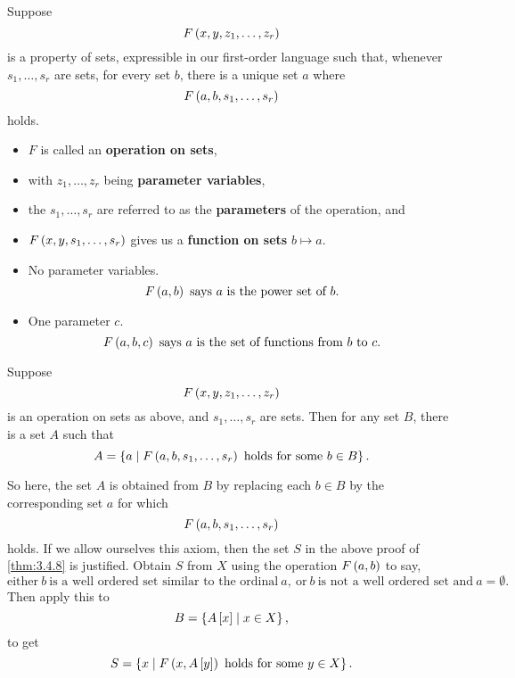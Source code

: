 \pagebreak

\begin{definition}
\label{def:3.4.9}
Suppose
$$ F\left( x, y, z_1, \dots, z_r \right) $$
is a property of sets, expressible in our first-order language such that, whenever $ s_1, \dots, s_r $ are sets, for every set $ b $, there is a unique set $ a $ where
$$ F\left( a, b, s_1, \dots, s_r \right) $$
holds.
\begin{itemize}
\item $ F $ is called an \textbf{operation on sets},
\item with $ z_1, \dots, z_r $ being \textbf{parameter variables},
\item the $ s_1, \dots, s_r $ are referred to as the \textbf{parameters} of the operation, and
\item $ F\left( x, y, s_1, \dots, s_r \right) $ gives us a \textbf{function on sets} $ b \mapsto a $.
\end{itemize}
\end{definition}

\begin{example2}
\hfill
\begin{itemize}
\item No parameter variables.
$$ F\rb{a, b} \ \text{says} \ a \ \text{is the power set of} \ b. $$
\item One parameter $ c $.
$$ F\left( a, b, c \right) \ \text{says} \ a \ \text{is the set of functions from} \ b \ \text{to} \ c. $$
\end{itemize}
\end{example2}

\begin{axiom}
Suppose
$$ F\left( x, y, z_1, \dots, z_r \right) $$
is an operation on sets as above, and $ s_1, \dots, s_r $ are sets. Then for any set $ B $, there is a set $ A $ such that
$$ A = \left\{ a \mid F\left( a, b, s_1, \dots, s_r \right) \ \text{holds for some} \ b \in B \right\}. $$
\end{axiom}

So here, the set $ A $ is obtained from $ B $ by replacing each $ b \in B $ by the corresponding set $ a $ for which
$$ F\left( a, b, s_1, \dots, s_r \right) $$
holds. If we allow ourselves this axiom, then the set $ S $ in the above proof of \ref{thm:3.4.8} is justified. Obtain $ S $ from $ X $ using the operation $ F\left( a, b \right) $ to say,
$$ \text{either} \ b \ \text{is a well ordered set similar to the ordinal} \ a, \ \text{or} \ b \ \text{is not a well ordered set and} \ a = \emptyset. $$
Then apply this to
$$ B = \left\{ A\left[ x \right] \mid x \in X \right\}, $$
to get
$$ S = \left\{ x \mid F\left( x, A\left[ y \right] \right) \ \text{holds for some} \ y \in X \right\}. $$

